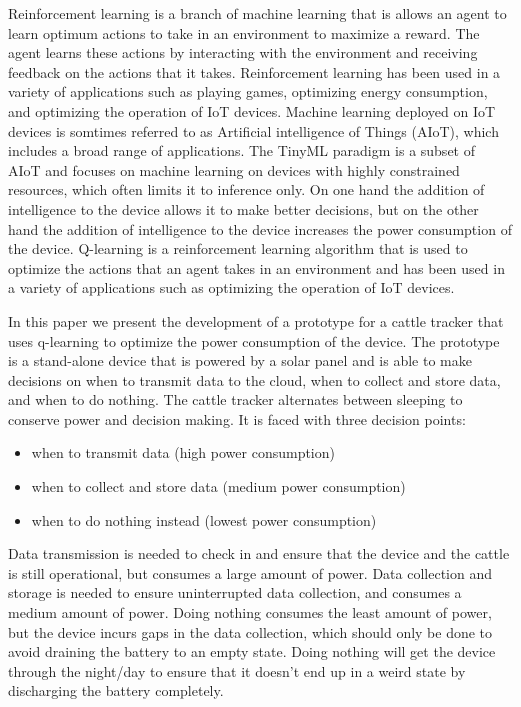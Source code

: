 \documentclass[10pt]{cai}
\begin{document}
Reinforcement learning is a branch of machine learning that is allows an agent to learn optimum actions to take in an environment to maximize a reward.
The agent learns these actions by interacting with the environment and receiving feedback on the actions that it takes.
Reinforcement learning has been used in a variety of applications such as playing games, optimizing energy consumption, and optimizing the operation of IoT devices.
Machine learning deployed on IoT devices is somtimes referred to as Artificial intelligence of Things (AIoT)\cite{yamsaniIoTBasedLivestockMonitoring2024}, which includes a broad range of applications.
The TinyML paradigm is a subset of AIoT and focuses on machine learning on devices with highly constrained resources, which often limits it to inference only\cite{rayReviewTinyMLStateoftheart2022}.
On one hand the addition of intelligence to the device allows it to make better decisions, but on the other hand the addition of intelligence to the device increases the power consumption of the device.
Q-learning is a reinforcement learning algorithm that is used to optimize the actions that an agent takes in an environment and has been used in a variety of applications such as optimizing the operation of IoT devices.

In this paper we present the development of a prototype for a cattle tracker that uses q-learning to optimize the power consumption of the device.
The prototype is a stand-alone device that is powered by a solar panel and is able to make decisions on when to transmit data to the cloud, when to collect and store data, and when to do nothing.
The cattle tracker alternates between sleeping to conserve power and decision making. 
It is faced with three decision points: 

\begin{itemize}
  \item when to transmit data (high power consumption)
  \item when to collect and store data (medium power consumption)
  \item when to do nothing instead (lowest power consumption)
\end{itemize}

Data transmission is needed to check in and ensure that the device and the cattle is still operational, but consumes a large amount of power.
Data collection and storage is needed to ensure uninterrupted data collection, and consumes a medium amount of power.
Doing nothing consumes the least amount of power, but the device incurs gaps in the data collection, which should only be done to avoid draining the battery to an empty state.
Doing nothing will get the device through the night/day to ensure that it doesn't end up in a weird state by discharging the battery completely.
\end{document}
